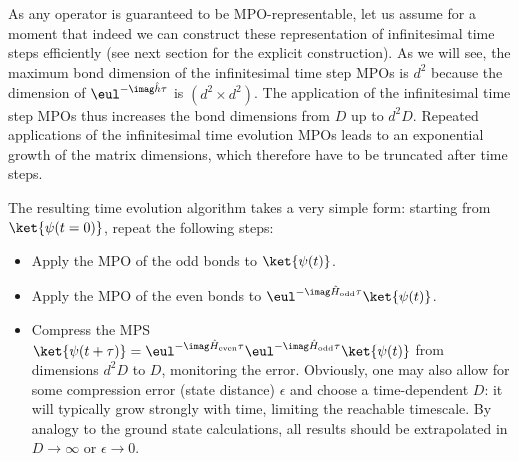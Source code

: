 As any operator is guaranteed to be MPO-representable, let us assume for a moment that indeed we can construct these representation of infinitesimal time steps efficiently (see next section for the explicit construction). As we will see, the maximum bond dimension of the infinitesimal time step MPOs is $d^2$ because the dimension of $\eul^{-\imag \hat{h} \tau}$ is $(d^2 \times d^2)$. The application of the infinitesimal time step MPOs thus increases the bond dimensions from $D$ up to $d^2 D$. Repeated applications of the infinitesimal time evolution MPOs leads to an exponential growth of the matrix dimensions, which therefore have to be truncated after time steps.

The resulting time evolution algorithm takes a very simple form: starting from $\ket{\psi(t=0)}$, repeat the following steps:
\begin{itemize}
\item Apply the MPO of the odd bonds to $\ket{\psi(t)}$.
\item Apply the MPO of the even bonds to $\eul^{-\imag \hat{H}_{{\rm odd}}\tau}\ket{\psi(t)}$.
\item Compress the MPS $\ket{\psi(t+\tau)}=\eul^{-\imag \hat{H}_{{\rm even}}\tau}\eul^{-\imag \hat{H}_{{\rm odd}}\tau}\ket{\psi(t)}$ from dimensions $d^2 D$ to $D$, monitoring the error. Obviously, one may also allow for some compression error (state distance) $\epsilon$ and choose a time-dependent $D$: it will typically grow strongly with time, limiting the reachable timescale. By analogy to the ground state calculations, all results should be extrapolated in $D\rightarrow\infty$ or $\epsilon\rightarrow 0$.
\end{itemize}

